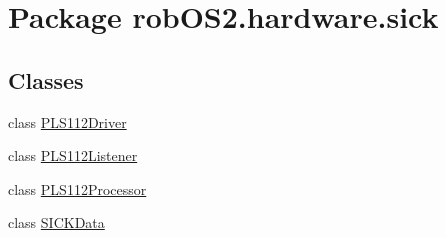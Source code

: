 \hypertarget{namespacerob_o_s2_1_1hardware_1_1sick}{
\section{Package robOS2.hardware.sick}
\label{namespacerob_o_s2_1_1hardware_1_1sick}
}
\subsection*{Classes}
\begin{DoxyCompactItemize}
\item 
class \hyperlink{classrob_o_s2_1_1hardware_1_1sick_1_1_p_l_s112_driver}{PLS112Driver}
\item 
class \hyperlink{classrob_o_s2_1_1hardware_1_1sick_1_1_p_l_s112_listener}{PLS112Listener}
\item 
class \hyperlink{classrob_o_s2_1_1hardware_1_1sick_1_1_p_l_s112_processor}{PLS112Processor}
\item 
class \hyperlink{classrob_o_s2_1_1hardware_1_1sick_1_1_s_i_c_k_data}{SICKData}
\end{DoxyCompactItemize}
